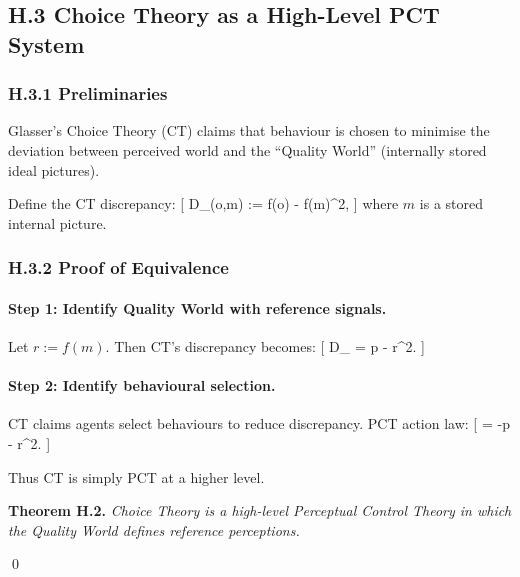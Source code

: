 \documentclass[11pt,a4paper,twoside]{article}
\begin{document}
\subsection*{H.3 Choice Theory as a High-Level PCT System}

\subsubsection*{H.3.1 Preliminaries}

Glasser’s Choice Theory (CT) claims that behaviour is chosen to minimise the deviation between perceived world and the “Quality World” (internally stored ideal pictures).

Define the CT discrepancy:
[
D_{}(o,m) := \lVert f(o) - f(m)\rVert^2,
]
where $m$ is a stored internal picture.

\subsubsection*{H.3.2 Proof of Equivalence}

\paragraph{Step 1: Identify Quality World with reference signals.}

Let $r := f(m)$. Then CT’s discrepancy becomes:
[
D_{} = \lVert p - r\rVert^2.
]

\paragraph{Step 2: Identify behavioural selection.}

CT claims agents select behaviours to reduce discrepancy. PCT action law:
[
= -\lVert p - r\rVert^2.
]

Thus CT is simply PCT at a higher level.

\medskip

\noindent\textbf{Theorem H.2.}
\emph{Choice Theory is a high-level Perceptual Control Theory in which the Quality World defines reference perceptions.}

\qed

\begin{center}
\end{center}
\end{document}
